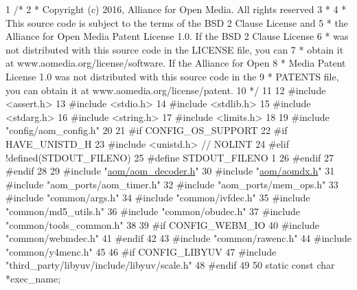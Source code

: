 \begin{DoxyCodeInclude}
1 \textcolor{comment}{/*}
2 \textcolor{comment}{ * Copyright (c) 2016, Alliance for Open Media. All rights reserved}
3 \textcolor{comment}{ *}
4 \textcolor{comment}{ * This source code is subject to the terms of the BSD 2 Clause License and}
5 \textcolor{comment}{ * the Alliance for Open Media Patent License 1.0. If the BSD 2 Clause License}
6 \textcolor{comment}{ * was not distributed with this source code in the LICENSE file, you can}
7 \textcolor{comment}{ * obtain it at www.aomedia.org/license/software. If the Alliance for Open}
8 \textcolor{comment}{ * Media Patent License 1.0 was not distributed with this source code in the}
9 \textcolor{comment}{ * PATENTS file, you can obtain it at www.aomedia.org/license/patent.}
10 \textcolor{comment}{ */}
11 
12 \textcolor{preprocessor}{#include <assert.h>}
13 \textcolor{preprocessor}{#include <stdio.h>}
14 \textcolor{preprocessor}{#include <stdlib.h>}
15 \textcolor{preprocessor}{#include <stdarg.h>}
16 \textcolor{preprocessor}{#include <string.h>}
17 \textcolor{preprocessor}{#include <limits.h>}
18 
19 \textcolor{preprocessor}{#include "config/aom\_config.h"}
20 
21 \textcolor{preprocessor}{#if CONFIG\_OS\_SUPPORT}
22 \textcolor{preprocessor}{#if HAVE\_UNISTD\_H}
23 \textcolor{preprocessor}{#include <unistd.h>}  \textcolor{comment}{// NOLINT}
24 \textcolor{preprocessor}{#elif !defined(STDOUT\_FILENO)}
25 \textcolor{preprocessor}{#define STDOUT\_FILENO 1}
26 \textcolor{preprocessor}{#endif}
27 \textcolor{preprocessor}{#endif}
28 
29 \textcolor{preprocessor}{#include "\hyperlink{aom__decoder_8h}{aom/aom\_decoder.h}"}
30 \textcolor{preprocessor}{#include "\hyperlink{aomdx_8h}{aom/aomdx.h}"}
31 \textcolor{preprocessor}{#include "aom\_ports/aom\_timer.h"}
32 \textcolor{preprocessor}{#include "aom\_ports/mem\_ops.h"}
33 \textcolor{preprocessor}{#include "common/args.h"}
34 \textcolor{preprocessor}{#include "common/ivfdec.h"}
35 \textcolor{preprocessor}{#include "common/md5\_utils.h"}
36 \textcolor{preprocessor}{#include "common/obudec.h"}
37 \textcolor{preprocessor}{#include "common/tools\_common.h"}
38 
39 \textcolor{preprocessor}{#if CONFIG\_WEBM\_IO}
40 \textcolor{preprocessor}{#include "common/webmdec.h"}
41 \textcolor{preprocessor}{#endif}
42 
43 \textcolor{preprocessor}{#include "common/rawenc.h"}
44 \textcolor{preprocessor}{#include "common/y4menc.h"}
45 
46 \textcolor{preprocessor}{#if CONFIG\_LIBYUV}
47 \textcolor{preprocessor}{#include "third\_party/libyuv/include/libyuv/scale.h"}
48 \textcolor{preprocessor}{#endif}
49 
50 \textcolor{keyword}{static} \textcolor{keyword}{const} \textcolor{keywordtype}{char} *exec\_name;

\end{DoxyCodeInclude}
